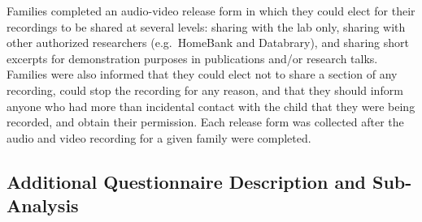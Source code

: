 \documentclass[]{article}
\begin{document}
Families completed an audio-video release form in which they could elect
for their recordings to be shared at several levels: sharing with the
lab only, sharing with other authorized researchers (e.g.~HomeBank and
Databrary), and sharing short excerpts for demonstration purposes in
publications and/or research talks. Families were also informed that
they could elect not to share a section of any recording, could stop the
recording for any reason, and that they should inform anyone who had
more than incidental contact with the child that they were being
recorded, and obtain their permission. Each release form was collected
after the audio and video recording for a given family were completed.
\renewcommand{\tablename}{Table S\hskip-\the\fontdimen2\font\space }
\begin{table}

\caption{\label{tab:Supplementary Table 1}Questionnaire Results. a:infants who had begun hands-and-knees crawling; b:infants who were exclusively breast-fed; c:infants who are not yet babbling. The `Missing' column reflects how many infants in the lab-and-home (LH) and lab-only (LO) sample did not fill out the questionnaire.}
\centering
{}
\end{table}

\subsection{Additional Questionnaire Description and
Sub-Analysis}\label{additional-questionnaire-description-and-sub-analysis}
\end{document}
